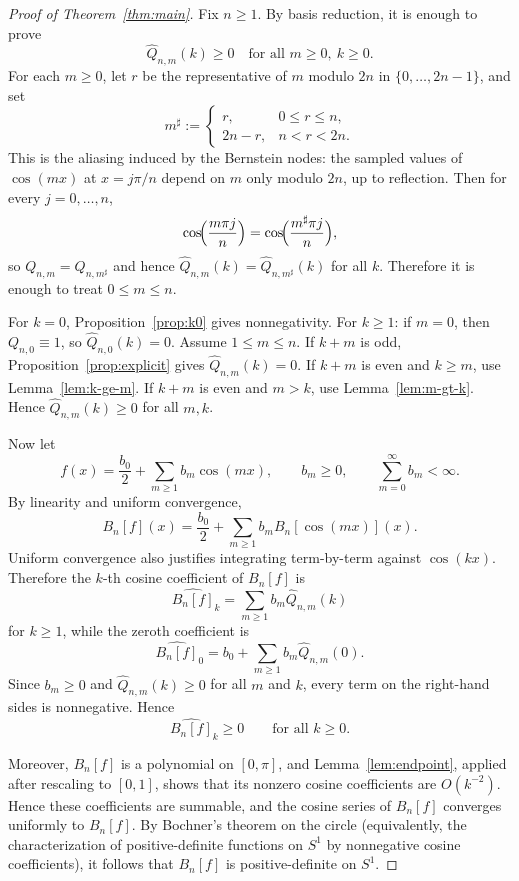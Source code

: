 \documentclass[a4paper,12pt]{amsart}
\theoremstyle{definition}
\theoremstyle{remark}
\begin{document}
\begin{proof}[Proof of Theorem~\ref{thm:main}]
Fix $n\ge1$. By basis reduction, it is enough to prove
\[
\widehat Q_{n,m}(k)\ge0
\quad\text{for all }m\ge0,\ k\ge0.
\]
For each $m\ge0$, let $r$ be the representative of $m$ modulo
$2n$ in $\{0,\ldots,2n-1\}$, and set
\[
m^\sharp :=
\begin{cases}
r, & 0\le r\le n,\\
2n-r, & n<r<2n.
\end{cases}
\]
This is the aliasing induced by the Bernstein nodes: the sampled values of $\cos(mx)$ at $x=j\pi/n$ depend on $m$ only modulo $2n$, up to reflection. Then for every $j=0,\dots,n$,
\[
\cos\!\Bigl(\frac{m\pi j}{n}\Bigr)
=\cos\!\Bigl(\frac{m^\sharp\pi j}{n}\Bigr),
\]
so $Q_{n,m}=Q_{n,m^\sharp}$ and hence
$\widehat Q_{n,m}(k)=\widehat Q_{n,m^\sharp}(k)$ for all $k$.
Therefore it is enough to treat $0\le m\le n$.

For $k=0$, Proposition~\ref{prop:k0} gives nonnegativity.
For $k\ge1$:
if $m=0$, then $Q_{n,0}\equiv1$, so $\widehat Q_{n,0}(k)=0$.
Assume $1\le m\le n$.
If $k+m$ is odd, Proposition~\ref{prop:explicit} gives
$\widehat Q_{n,m}(k)=0$.
If $k+m$ is even and $k\ge m$, use Lemma~\ref{lem:k-ge-m}.
If $k+m$ is even and $m>k$, use Lemma~\ref{lem:m-gt-k}.
Hence $\widehat Q_{n,m}(k)\ge0$ for all $m,k$.

Now let
\[
f(x)=\frac{b_0}{2}+\sum_{m\ge1}b_m\cos(mx),\qquad b_m\ge0,\qquad \sum_{m=0}^\infty  b_m<\infty.
\]
By linearity and uniform convergence,
\[
B_n[f](x) = \frac{b_0}{2}+\sum_{m\ge1}b_m  B_n[\cos(mx)](x).
\]
Uniform convergence also justifies integrating term-by-term against $\cos(kx)$. Therefore the $k$-th cosine coefficient of $B_n[f]$ is
\[ 
\widehat{B_n[f]}_k = \sum_{m\ge1} b_m \widehat Q_{n,m}(k) 
\] 
for $k\ge1$, while the zeroth coefficient is 
\[ 
\widehat{B_n[f]}_0 = b_0+\sum_{m\ge1}b_m \widehat Q_{n,m}(0). 
\]
Since $b_m\ge0$ and $\widehat Q_{n,m}(k)\ge0$ for all $m$ and $k$, every term on the right-hand sides is nonnegative. Hence
\[ \widehat{B_n[f]}_k\ge0 \qquad\text{for all }k\ge0. \]

Moreover, $B_n[f]$ is a polynomial on $[0,\pi]$, and Lemma~\ref{lem:endpoint}, applied after rescaling to $[0,1]$, shows that its nonzero cosine coefficients are $O(k^{-2})$. Hence these coefficients are summable, and the cosine series of $B_n[f]$ converges uniformly to $B_n[f]$. By Bochner's theorem on the circle (equivalently, the characterization of positive-definite functions on $S^1$ by nonnegative cosine coefficients), it follows that $B_n[f]$ is positive-definite on $S^1$.
\end{proof}
\end{document}
